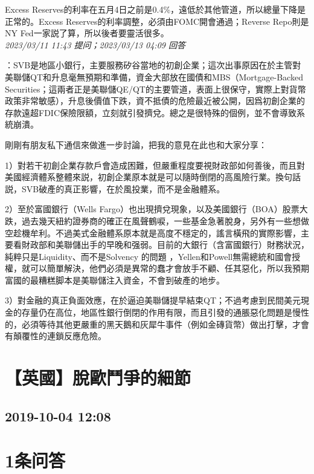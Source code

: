 \documentclass[twocolumn]{ctexart}
\begin{document}
Excess Reserves的利率在五月4日之前是0.4\%，遠低於其他管道，所以總量下降是正常的。Excess Reserves的利率調整，必須由FOMC開會通過；Reverse Repo則是NY Fed一家説了算，所以後者要靈活很多。
\\

\textit{\hfill\noindent\small 2023/03/11 11:43 提问；2023/03/13 04:09 回答}

：SVB是地區小銀行，主要服務矽谷當地的初創企業；這次出事原因在於主管對美聯儲QT和升息毫無預期和準備，資金大部放在國債和MBS（Mortgage-Backed Securities；這兩者正是美聯儲QE/QT的主要管道，表面上很保守，實際上對貨幣政策非常敏感），升息後價值下跌，資不抵債的危險最近被公開，因爲初創企業的存款遠超FDIC保險限額，立刻就引發擠兌。總之是很特殊的個例，並不會導致系統崩潰。


剛剛有朋友私下通信來做進一步討論，把我的意見在此也和大家分享：

1）對若干初創企業存款戶會造成困難，但嚴重程度要視財政部如何善後，而且對美國經濟體系整體來説，初創企業原本就是可以隨時倒閉的高風險行業。換句話説，SVB破產的真正影響，在於風投業，而不是金融體系。

2）至於富國銀行（Wells Fargo）也出現擠兌現象，以及美國銀行（BOA）股票大跌，過去幾天紐約證券商的確正在風聲鶴唳，一些基金急著脫身，另外有一些想做空趁機牟利。不過美式金融體系原本就是高度不穩定的，謠言橫飛的實際影響，主要看財政部和美聯儲出手的早晚和强弱。目前的大銀行（含富國銀行）財務狀況，純粹只是Liquidity、而不是Solvency 的問題 ，Yellen和Powell無需總統和國會授權，就可以簡單解決，他們必須是異常的蠢才會放手不顧、任其惡化，所以我預期富國的最糟糕脚本是美聯儲注入資金，不會到破產的地步。

3）對金融的真正負面效應，在於逼迫美聯儲提早結束QT；不過考慮到民間美元現金的存量仍在高位，地區性銀行倒閉的作用有限，而且引發的通脹惡化問題是慢性的，必須等待其他更嚴重的黑天鵝和灰犀牛事件（例如金磚貨幣）做出打擊，才會有顛覆性的連鎖反應危險。
\\


\section{【英國】脫歐鬥爭的細節}
\subsection{2019-10-04 12:08}


\section{1条问答}
\end{document}
